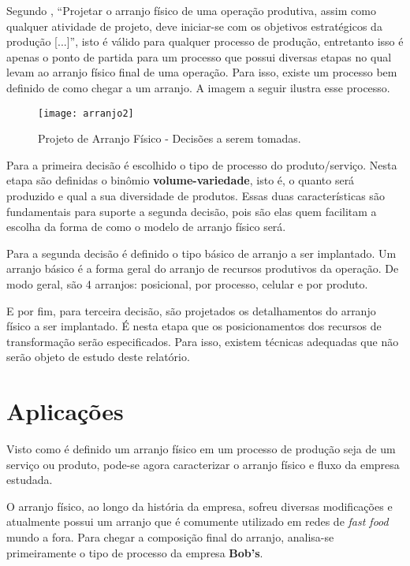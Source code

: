 		Segundo \cite{slack}, “Projetar o arranjo físico de uma operação produtiva, assim como qualquer atividade de projeto, deve iniciar-se com os objetivos estratégicos da produção [...]”, isto é válido para qualquer processo de produção, entretanto isso é apenas o ponto de partida para um processo que possui diversas etapas no qual levam ao arranjo físico final de uma operação. Para isso, existe um processo bem definido de como chegar a um arranjo. A imagem a seguir ilustra esse processo.

		\begin{figure}[h]
			\centering
			\texttt{[image: arranjo2]}
			\caption[Projeto de Arranjo Físico - Decisões a serem tomadas]{Projeto de Arranjo Físico - Decisões a serem tomadas. \cite{slack}}
			\label{fig:arranjo2}
		\end{figure}

		Para a primeira decisão é escolhido o tipo de processo do produto/serviço. Nesta etapa são definidas o binômio \textbf{volume-variedade}, isto é, o quanto será produzido e qual a sua diversidade de produtos. Essas duas características são fundamentais para suporte a segunda decisão, pois são elas quem facilitam a escolha da forma de como o modelo de arranjo físico será.

		Para a segunda decisão é definido o tipo básico de arranjo a ser implantado.  Um arranjo básico é a forma geral do arranjo de recursos produtivos da operação. De modo geral, são 4 arranjos: posicional, por processo, celular e por produto.

		E por fim, para terceira decisão, são projetados os detalhamentos do arranjo físico a ser implantado. É nesta etapa que os posicionamentos dos recursos de transformação serão especificados. Para isso, existem técnicas adequadas que não serão objeto de estudo deste relatório.

	\section[Aplicações]{Aplicações}
	\label{sec:arranjo_aplicacoes}

		Visto como é definido um arranjo físico em um processo de produção seja de um serviço ou produto, pode-se agora caracterizar o arranjo físico e fluxo da empresa estudada. 

		O arranjo físico, ao longo da história da empresa, sofreu diversas modificações e atualmente possui um arranjo que é comumente utilizado em redes de \emph{fast food} mundo a fora. Para chegar a composição final do arranjo, analisa-se primeiramente o tipo de processo da empresa \textbf{Bob’s}.

